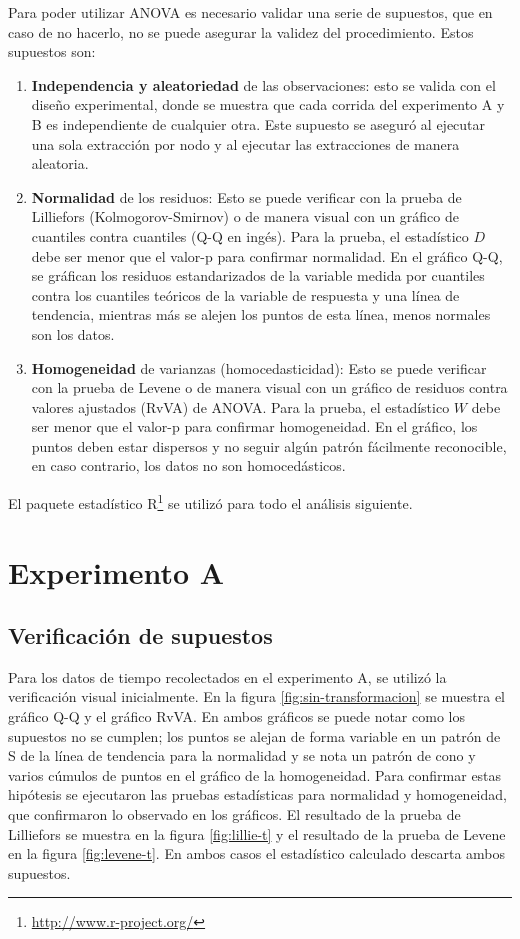 Para poder utilizar ANOVA es necesario validar una serie de supuestos\cite{Montgomery2001}, que en caso de no hacerlo, no se puede asegurar la validez del procedimiento. Estos supuestos son:
\begin{enumerate}
    \item \textbf{Independencia y aleatoriedad} de las observaciones: esto se valida con el diseño experimental, donde se muestra que cada corrida del experimento A y B es independiente de cualquier otra. Este supuesto se aseguró al ejecutar una sola extracción por nodo y al ejecutar las extracciones de manera aleatoria.
    \item \textbf{Normalidad} de los residuos: Esto se puede verificar con la prueba de Lilliefors (Kolmogorov-Smirnov)\cite{Thode2002} o de manera visual con un gráfico de cuantiles contra cuantiles (Q-Q en ingés). Para la prueba, el estadístico $D$ debe ser menor que el valor-p para confirmar normalidad. En el gráfico Q-Q, se gráfican los residuos estandarizados de la variable medida por cuantiles contra los cuantiles teóricos de la variable de respuesta y una línea de tendencia, mientras más se alejen los puntos de esta línea, menos normales son los datos.
    \item \textbf{Homogeneidad} de varianzas (homocedasticidad): Esto se puede verificar con la prueba de Levene\cite{Levene1960} o de manera visual con un gráfico de residuos contra valores ajustados (RvVA) de ANOVA. Para la prueba, el estadístico $W$ debe ser menor que el valor-p para confirmar homogeneidad. En el gráfico, los puntos deben estar dispersos y no seguir algún patrón fácilmente reconocible, en caso contrario, los datos no son homocedásticos.
\end{enumerate}

El paquete estadístico R\footnote{\url{http://www.r-project.org/}} se utilizó para todo el análisis siguiente.

\section{Experimento A}

\subsection{Verificación de supuestos}

Para los datos de tiempo recolectados en el experimento A, se utilizó la verificación visual inicialmente. En la figura \ref{fig:sin-transformacion} se muestra el gráfico Q-Q y el gráfico RvVA. En ambos gráficos se puede notar como los supuestos no se cumplen; los puntos se alejan de forma variable en un patrón de S de la línea de tendencia para la normalidad y se nota un patrón de cono y varios cúmulos de puntos en el gráfico de la homogeneidad.
Para confirmar estas hipótesis se ejecutaron las pruebas estadísticas para normalidad y homogeneidad, que confirmaron lo observado en los gráficos. El resultado de la prueba de Lilliefors se muestra en la figura \ref{fig:lillie-t} y el resultado de la prueba de Levene en la figura \ref{fig:levene-t}.
En ambos casos el estadístico calculado descarta ambos supuestos.


